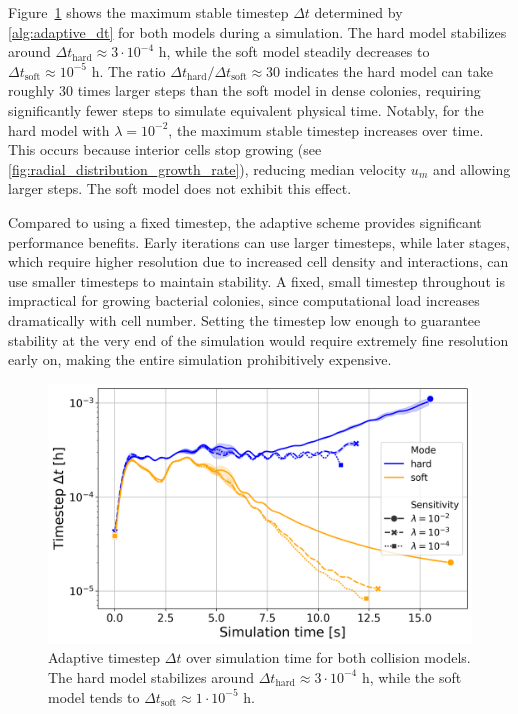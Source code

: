 \documentclass[conference]{IEEEtran}
\begin{document}
Figure~\ref{fig:simulation_time_vs_dt} shows the maximum stable timestep $\Delta t$ determined by \autoref{alg:adaptive_dt} for both models during a simulation. The hard model stabilizes around $\Delta t_{\text{hard}} \approx 3 \cdot 10^{-4}$ h, while the soft model steadily decreases to $\Delta t_{\text{soft}} \approx 10^{-5}$ h. The ratio $\Delta t_{\text{hard}}/\Delta t_{\text{soft}} \approx 30$ indicates the hard model can take roughly 30 times larger steps than the soft model in dense colonies, requiring significantly fewer steps to simulate equivalent physical time. Notably, for the hard model with $\lambda = 10^{-2}$, the maximum stable timestep increases over time. This occurs because interior cells stop growing (see \autoref{fig:radial_distribution_growth_rate}), reducing median velocity $u_m$ and allowing larger steps. The soft model does not exhibit this effect.

Compared to using a fixed timestep, the adaptive scheme provides significant performance benefits. Early iterations can use larger timesteps, while later stages, which require higher resolution due to increased cell density and interactions, can use smaller timesteps to maintain stability. A fixed, small timestep throughout is impractical for growing bacterial colonies, since computational load increases dramatically with cell number. Setting the timestep low enough to guarantee stability at the very end of the simulation would require extremely fine resolution early on, making the entire simulation prohibitively expensive.

\begin{figure}[H]
    \centering
    \includegraphics[width=\linewidth]{figures/comparison_plots/combined_simulation_time [s]_vs_dt.png}
    \caption{Adaptive timestep $\Delta t$ over simulation time for both collision models. The hard model stabilizes around $\Delta t_{\text{hard}} \approx 3 \cdot 10^{-4}$ h, while the soft model tends to $\Delta t_{\text{soft}} \approx 1 \cdot 10^{-5}$ h.}
    \label{fig:simulation_time_vs_dt}
\end{figure}
\end{document}
